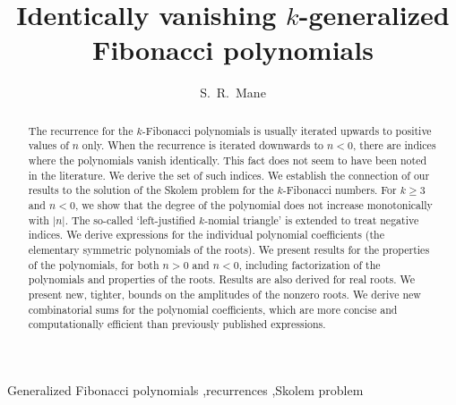 \documentclass[review]{elsarticle}
\theoremstyle{plain}
\begin{document}

\begin{frontmatter}

\title{Identically vanishing $k$-generalized Fibonacci polynomials}

\author[cc]{S.~R.~Mane}
\address[cc]{Convergent Computing Inc., P.~O.~Box 561, Shoreham, NY 11786, USA}

\begin{abstract}
The recurrence for the $k$-Fibonacci polynomials
is usually iterated upwards to positive values of $n$ only.
When the recurrence is iterated downwards to $n<0$,
there are indices where the polynomials vanish identically.
This fact does not seem to have been noted in the literature.
We derive the set of such indices.
We establish the connection of our results to the solution of the Skolem problem for the $k$-Fibonacci numbers.
For $k\ge3$ and $n<0$, we show that the degree of the polynomial does not increase monotonically with $|n|$.
The so-called `left-justified $k$-nomial triangle' is extended to treat negative indices.
We derive expressions for the individual polynomial coefficients (the elementary symmetric polynomials of the roots).
We present results for the properties of the polynomials, for both $n>0$ and $n<0$,
including factorization of the polynomials and properties of the roots.
Results are also derived for real roots.
We present new, tighter, bounds on the amplitudes of the nonzero roots.
We derive new combinatorial sums for the polynomial coefficients,
which are more concise and computationally efficient than previously published expressions.
\end{abstract}

\begin{keyword}
  Generalized Fibonacci polynomials
  \sep recurrences
  \sep Skolem problem


\end{keyword}

\end{frontmatter}

\newpage
\setcounter{equation}{0}
\end{document}
